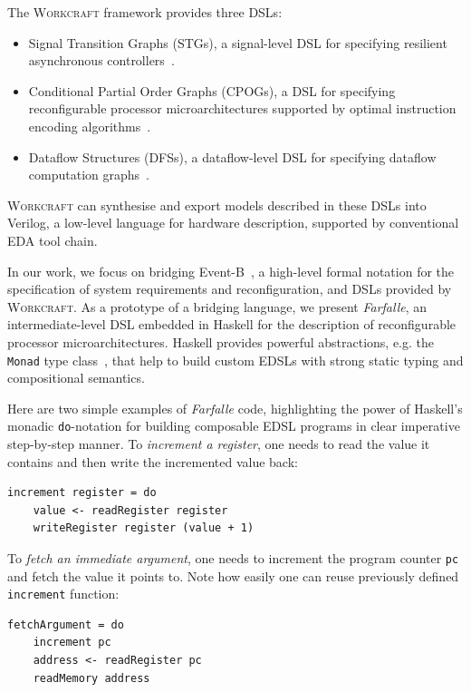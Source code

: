 \documentclass[conference]{IEEEtran}
\begin{document}
The \textsc{Workcraft} framework provides three DSLs:

\begin{itemize}
\item Signal Transition Graphs (STGs), a signal-level DSL for
specifying resilient asynchronous controllers~\cite{STG}.
\item Conditional Partial Order Graphs (CPOGs), a DSL for specifying
reconfigurable processor microarchitectures supported by optimal
instruction encoding algorithms~\cite{ISA-formal}.
\item Dataflow Structures (DFSs), a dataflow-level DSL
for specifying dataflow computation graphs~\cite{DFS}.
\end{itemize}

\textsc{Workcraft} can synthesise and export models described in these DSLs into
Verilog, a low-level language for hardware description, supported
by conventional EDA tool chain.

In our work, we focus on bridging Event-B~\cite{EventB}, a high-level formal notation
for the specification of system requirements and reconfiguration,
and DSLs provided by \textsc{Workcraft}. As a prototype of a bridging language,
we present \emph{Farfalle}, an intermediate-level DSL embedded in Haskell for
the description of reconfigurable processor microarchitectures.
Haskell provides powerful abstractions, e.g. the \texttt{Monad} type
class~\cite{WadlerMonads},
that help to build custom EDSLs with strong static typing and compositional
semantics.

Here are two simple examples of \emph{Farfalle} code, highlighting the power of
Haskell's monadic \texttt{do}-notation for building composable EDSL programs in clear
imperative step-by-step manner. To \emph{increment a register}, one needs to
read the value it contains and then write the incremented value back:

\vspace{-2mm}
\begin{verbatim}
increment register = do
    value <- readRegister register
    writeRegister register (value + 1)
\end{verbatim}
\vspace{-1mm}

\noindent
To \emph{fetch an immediate argument}, one needs to
increment the program counter \texttt{pc} and fetch the value it points to. Note
how easily one can reuse previously defined \texttt{increment} function:

\vspace{-2mm}
\begin{verbatim}
fetchArgument = do
    increment pc
    address <- readRegister pc
    readMemory address
\end{verbatim}
\vspace{-1mm}
\end{document}
